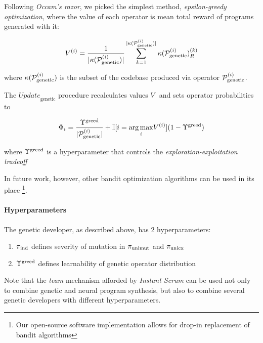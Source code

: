 Following \emph{Occam's razor}, we picked the simplest method, \emph{epsilon-greedy optimization}, where the value of each operator is mean total reward of programs generated with it:

\begin{equation}
    V^{(i)} = \frac{1}{|\kappa(\mathcal{P}_\text{genetic}^{(i)})|} 
    \sum\limits_{k=1}^{|\kappa(\mathcal{P}_\text{genetic}^{(i)})|}
    \kappa(\mathcal{P}_\text{genetic}^{(i)})_R^{(k)} 
\end{equation}

where $\kappa(\mathcal{P}_\text{genetic}^{(i)})$ is the subset of the codebase produced via operator $\mathcal{P}_\text{genetic}^{(i)}$.

The $\mathit{Update}_\text{genetic}$ procedure recalculates values $V$ and sets operator probabilities to

\begin{equation}
    \Phi_i = \frac{\Upsilon^\text{greed}}{|\mathcal{P}_\text{genetic}^{(i)}|} +
    \mathbb{I}[i = \underset{i}{\arg\max} V^{(i)}] (1 - \Upsilon^\text{greed})
\end{equation}

where $\Upsilon^\text{greed}$ is a hyperparameter that controls the \emph{exploration-exploitation tradeoff} \cite{banditsexplo}

In future work, however, other bandit optimization algorithms can be used in its place \footnote{Our open-source software implementation allows for drop-in replacement of bandit algorithms}.

\paragraph{Hyperparameters}

The genetic developer, as described above, has 2 hyperparameters:

\begin{enumerate}
    \item $\pi_\text{ind}$ defines severity of mutation in $\pi_\text{unimut}$ and $\pi_\text{unicx}$
    \item $\Upsilon^\text{greed}$ defines learnability of genetic operator distribution
\end{enumerate}

Note that the \emph{team} mechanism afforded by \emph{Instant Scrum} can be used not only to combine genetic and neural program synthesis, but also to combine several genetic developers with different hyperparameters.

